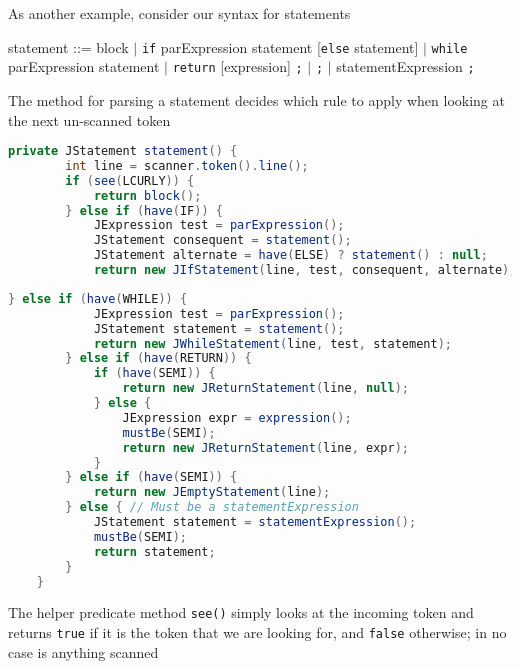 \documentclass[8pt,a4paper,compress]{beamer}
\newcommand{\mm}[1]{$#1$}
\newenvironment{spaced}
{
\smallskip
\hspace{.5cm}
\begin{minipage}[c]{\textwidth}
}
{
\end{minipage}
\smallskip
}
\begin{document}
\begin{frame}[fragile]
\pause

As another example, consider our syntax for statements

\text{ }
\begin{spaced}
\begin{production}
statement ::= block
                  \mm{|} \lstinline{if} parExpression statement [\lstinline{else} statement]
                  \mm{|} \lstinline{while} parExpression statement
                  \mm{|} \lstinline{return} [expression] \lstinline{;}
                  \mm{|} \lstinline{;}
                  \mm{|} statementExpression \lstinline{;}
\end{production}
\end{spaced}

\pause
\bigskip

The method for parsing a statement decides which rule to apply when looking at the next un-scanned token

\begin{lstlisting}[language=Java]
    private JStatement statement() {
        int line = scanner.token().line();
        if (see(LCURLY)) {
            return block();
        } else if (have(IF)) {
            JExpression test = parExpression();
            JStatement consequent = statement();
            JStatement alternate = have(ELSE) ? statement() : null;
            return new JIfStatement(line, test, consequent, alternate);
\end{lstlisting}
\end{frame}

\begin{frame}[fragile]
\pause

\begin{lstlisting}[language=Java]
        } else if (have(WHILE)) {
            JExpression test = parExpression();
            JStatement statement = statement();
            return new JWhileStatement(line, test, statement);
        } else if (have(RETURN)) {
            if (have(SEMI)) {
                return new JReturnStatement(line, null);
            } else {
                JExpression expr = expression();
                mustBe(SEMI);
                return new JReturnStatement(line, expr);
            }
        } else if (have(SEMI)) {
            return new JEmptyStatement(line);
        } else { // Must be a statementExpression
            JStatement statement = statementExpression();
            mustBe(SEMI);
            return statement;
        }
    }
\end{lstlisting}

\pause
\bigskip

The helper predicate method \lstinline{see()} simply looks at the incoming token and returns \lstinline{true} if it is the token that we are looking for, and \lstinline{false} otherwise; in no case is anything scanned
\end{frame}
\end{document}
